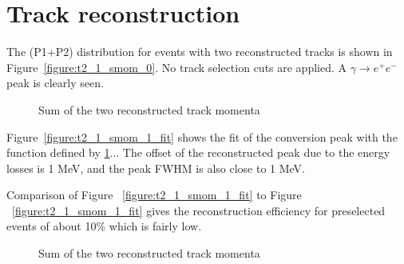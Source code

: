 %
\section{Track reconstruction}
The (P1+P2) distribution for events with two reconstructed tracks is shown in Figure~\ref{figure:t2_1_smom_0}.
No track selection cuts are applied. A $\gamma \to e^+e^-$ peak  is clearly seen.

\begin{figure}[H]
  \caption{
    \label{figure:t2_1_smom_0}
    Sum of the two reconstructed track momenta
  }
  \label{figure:event_display}
\end{figure}

Figure~\ref{figure:t2_1_smom_1_fit} shows the fit of the conversion peak with the function
defined by \ref{}... The offset of the reconstructed peak due to the energy losses is 1 MeV,
and the peak FWHM is also close to 1 MeV.

Comparison of Figure ~\ref{figure:t2_1_smom_1_fit} to Figure ~\ref{figure:t2_1_smom_1_fit}
gives the reconstruction efficiency for preselected events of about 10\% which is fairly low.

\begin{figure}[H]
  \caption{
    \label{figure:t2_1_smom_1_fit}
    Sum of the two reconstructed track momenta
  }
  \label{figure:event_display}
\end{figure}

